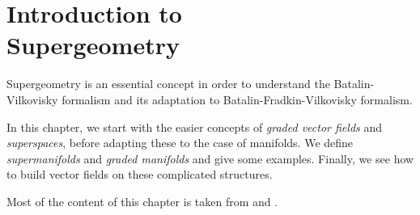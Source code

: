 \chapter[Introduction to Supergeometry]{Introduction to \\ Supergeometry}
\label{chap:intro_supergeom}

Supergeometry is an essential concept in order to understand the Batalin-Vilkovisky formalism and its adaptation to Batalin-Fradkin-Vilkovisky formalism.

In this chapter, we start with the easier concepts of \emph{graded vector fields} and \emph{superspaces}, before adapting these to the case of manifolds.
We define \emph{supermanifolds} and \emph{graded manifolds} and give some examples.
Finally, we see how to build vector fields on these complicated structures.

Most of the content of this chapter is taken from \cite{Nima} and \cite{Intro_BV-BFV}.




